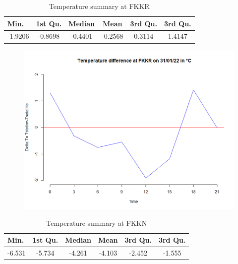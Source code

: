 \newpage

       


\begin{table}[H]
\caption{Temperature summary at FKKR}
\label{tab:Temperature summary at FKKR}
\begin{center}
\begin{tabular}{| l | c | c |c |c |c |}
\hline
\textbf{\small{Min.}} & \textbf{\small{1st Qu.}} & \textbf{\small{Median}}& \textbf{\small{Mean}} & \textbf{\small{3rd Qu.}} & \textbf{\small{3rd Qu.}}\\[2pt] \hline

\small{-1.9206}& \small{-0.8698}& \small{-0.4401}& \small{-0.2568}&  \small{0.3114}& \small{1.4147} \\ \hline

\end{tabular}
\end{center}
\end{table}

\begin{figure}[H]
\begin{center}
\includegraphics[scale=0.6]{fkkr1.png} %
\end{center}
\end{figure}


\begin{table}[H]
\caption{Temperature summary at FKKN}
\label{tab:Temperature summary at FKKN}
\begin{center}
\begin{tabular}{| l | c | c |c |c |c |}
\hline
\textbf{\small{Min.}} & \textbf{\small{1st Qu.}} & \textbf{\small{Median}}& \textbf{\small{Mean}} & \textbf{\small{3rd Qu.}} & \textbf{\small{3rd Qu.}}\\[2pt] \hline

\small{-6.531}& \small{-5.734}& \small{-4.261}& \small{-4.103}& \small{-2.452}& \small{-1.555} \\ \hline

\end{tabular}
\end{center}
\end{table}


